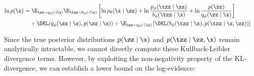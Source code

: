 





% 
% 
% 


\begin{equation}
    \begin{split}
        \ln{p(\x)}
        & =
        \E_{\zz \sim q_{\phi}(\cdot \mid \x)} \E_{\tzz \sim  b_{\phi}(\cdot \mid \x)}
        \left[
            \ln p_{\theta}(\x \mid \zz) +
            \ln \frac{p_{\phi}(\tzz \mid \zz)}{b_{\phi}(\tzz \mid \x)} +
            \ln \frac{p(\zz)}{q_{\phi}(\zz \mid \x)}
            \right] \\
        & \quad
        + \DKL(q_{\phi}(\zz \mid \x), p(\zz \mid \x)) +
        \E_{\zz \sim q_{\phi}(\cdot \mid \x)}
        \left[
            \DKL(b_{\phi}(\tzz \mid \x),p(\tzz \mid \x, \zz))
            \right]
        \\
    \end{split}
\end{equation}

Since the true posterior distributions $p(\zz \mid \x)$ and $p(\tzz \mid \zz, \x)$ remain analytically intractable, we cannot directly compute these Kullback-Leibler divergence terms. However, by exploiting the non-negativity property of the KL-divergence, we can establish a lower bound on the log-evidence:


